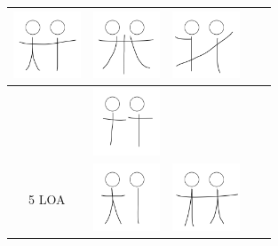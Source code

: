 \documentclass[12pt, a4paper]{memoir}
\begin{document}
\begin{table}[!htb]
\begin{tabular}{ | c | c || c | c | c | }
\begin{minipage}{.15\textwidth}
      \includegraphics[width=\linewidth, height=20mm]{img/07keyframe}
    \end{minipage}
    &
    \begin{minipage}{.15\textwidth}
      \includegraphics[width=\linewidth, height=20mm]{img/08keyframe}
    \end{minipage} 
    & 
    \begin{minipage}{.15\textwidth}
      \includegraphics[width=\linewidth, height=20mm]{img/09keyframe}
    \end{minipage} 
    \\ \hline 
    &
    \begin{minipage}{.15\textwidth}
      \includegraphics[width=\linewidth, height=20mm]{img/4-1loa_separate_keyframe}
    \end{minipage}
    & & & 
    \\ \hline
    5 LOA 
    &
    \begin{minipage}{.15\textwidth}
      \includegraphics[width=\linewidth, height=20mm]{img/5loa_separate_keyframe}
    \end{minipage}
    &
    \begin{minipage}{.15\textwidth}
      \includegraphics[width=\linewidth, height=20mm]{img/10keyframe}

\end{minipage}
\end{tabular}
\end{table}
\end{document}

